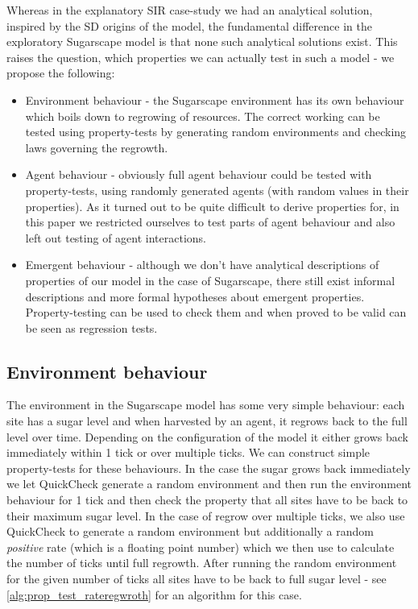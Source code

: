 Whereas in the explanatory SIR case-study we had an analytical solution, inspired by the SD origins of the model, the fundamental difference in the exploratory Sugarscape model is that none such analytical solutions exist. This raises the question, which properties we can actually test in such a model - we propose the following:
\begin{itemize}
	\item Environment behaviour - the Sugarscape environment has its own behaviour which boils down to regrowing of resources. The correct working can be tested using property-tests by generating random environments and checking laws governing the regrowth.
	\item Agent behaviour - obviously full agent behaviour could be tested with property-tests, using randomly generated agents (with random values in their properties). As it turned out to be quite difficult to derive properties for, in this paper we restricted ourselves to test parts of agent behaviour and also left out testing of agent interactions.
	\item Emergent behaviour - although we don't have analytical descriptions of properties of our model in the case of Sugarscape, there still exist informal descriptions and more formal hypotheses about emergent properties. Property-testing can be used to check them and when proved to be valid can be seen as regression tests.
\end{itemize}

\subsection{Environment behaviour}
The environment in the Sugarscape model has some very simple behaviour: each site has a sugar level and when harvested by an agent, it regrows back to the full level over time. Depending on the configuration of the model it either grows back immediately within 1 tick or over multiple ticks. We can construct simple property-tests for these behaviours. In the case the sugar grows back immediately we let QuickCheck generate a random environment and then run the environment behaviour for 1 tick and then check the property that all sites have to be back to their maximum sugar level. In the case of regrow over multiple ticks, we also use QuickCheck to generate a random environment but additionally a random \textit{positive} rate (which is a floating point number) which we then use to calculate the number of ticks until full regrowth. After running the random environment for the given number of ticks all sites have to be back to full sugar level - see \ref{alg:prop_test_rateregwroth} for an algorithm for this case.

